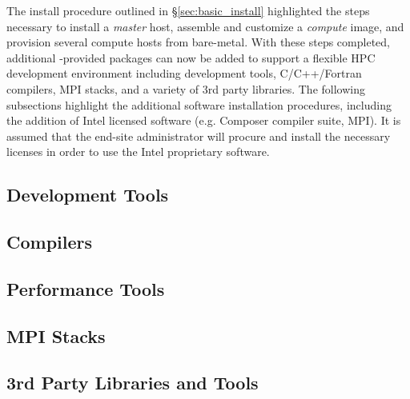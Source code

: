 \documentclass[letterpaper]{article}
\newcommand{\install}{yum -y install}
\begin{document}
The install procedure outlined in \S\ref{sec:basic_install}
highlighted the steps necessary to install a {\em master} host,
assemble and customize a {\em compute} image, and provision several
compute hosts from bare-metal.  With these steps completed, 
additional \FSP{}-provided packages can now be added to support a flexible HPC
development environment including development tools, C/C++/Fortran compilers,
MPI stacks, and a variety of 3rd party libraries. The following subsections
highlight the additional software installation procedures, including the
addition of Intel licensed software (e.g. Composer compiler suite, \Intel{}
MPI). It is assumed that the end-site administrator will procure and install
the necessary licenses in order to use the Intel proprietary software.

\subsection{Development Tools} \label{sec:install_dev_tools}


\subsection{Compilers} \label{sec:install_compilers}


\subsection{Performance Tools} \label{sec:install_perf_tools}


\subsection{MPI Stacks} \label{sec:mpi}



\subsection{3rd Party Libraries and Tools} \label{sec:3rdparty}
\end{document}

